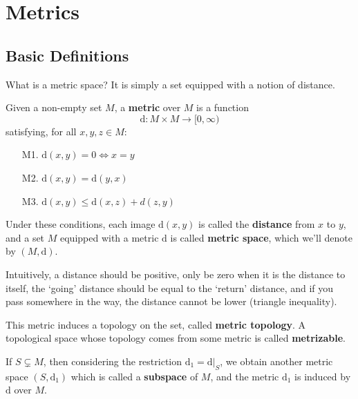 \chapter{Metrics}

\section{Basic Definitions}

What is a metric space? It is simply a set equipped with a notion of distance. 

\begin{definition}
Given a non-empty set $M$, a \textbf{metric} over $M$ is a function
\[
	\mathrm{d} : M \times M \longrightarrow [0, \infty)
\] 
satisfying, for all $x, y, z \in M$:
\begin{itemize}
	\item[M1.] $\mathrm{d}(x,y) = 0 \iff x = y$
	\item[M2.] $\mathrm{d}(x,y) = \mathrm{d}(y,x)$
	\item[M3.] $\mathrm{d}(x,y) \leq \mathrm{d}(x,z) + d(z,y)$
\end{itemize}
Under these conditions, each image $\mathrm{d}(x,y)$ is called the \textbf{distance} from $x$ to $y$, and a set $M$ equipped with a metric $\mathrm{d}$ is called \textbf{metric space}, which we'll denote by $(M,\mathrm{d})$.
\end{definition}

Intuitively, a distance should be positive, only be zero when it is the distance to itself, the `going' distance should be equal to the `return' distance, and if you pass somewhere in the way, the distance cannot be lower (triangle inequality).

This metric induces a topology on the set, called \textbf{metric topology}. A topological space whose topology comes from some metric is called \textbf{metrizable}.

If $S \subsetneq M$, then considering the restriction $\mathrm{d}_1 = \left.\mathrm{d}\right|_S$, we obtain another metric space $(S, \mathrm{d}_1)$ which is called a \textbf{subspace} of $M$, and the metric $\mathrm{d}_1$ is induced by $\mathrm{d}$ over $M$.

